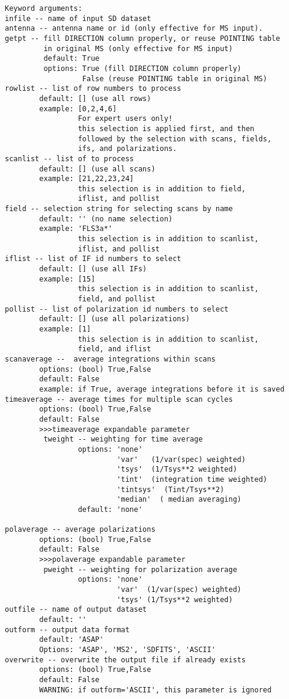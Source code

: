 \begin{verbatim}
Keyword arguments:
infile -- name of input SD dataset
antenna -- antenna name or id (only effective for MS input). 
getpt -- fill DIRECTION column properly, or reuse POINTING table 
         in original MS (only effective for MS input)
         default: True
         options: True (fill DIRECTION column properly)
                  False (reuse POINTING table in original MS)
rowlist -- list of row numbers to process
        default: [] (use all rows)
        example: [0,2,4,6]
                 For expert users only!
                 this selection is applied first, and then 
                 followed by the selection with scans, fields, 
                 ifs, and polarizations. 
scanlist -- list of to process
        default: [] (use all scans)
        example: [21,22,23,24]
                 this selection is in addition to field,
                 iflist, and pollist
field -- selection string for selecting scans by name
        default: '' (no name selection)
        example: 'FLS3a*'
                 this selection is in addition to scanlist,
                 iflist, and pollist
iflist -- list of IF id numbers to select
        default: [] (use all IFs)
        example: [15]
                 this selection is in addition to scanlist,
                 field, and pollist
pollist -- list of polarization id numbers to select
        default: [] (use all polarizations)
        example: [1]
                 this selection is in addition to scanlist,
                 field, and iflist
scanaverage --  average integrations within scans
        options: (bool) True,False
        default: False
        example: if True, average integrations before it is saved
timeaverage -- average times for multiple scan cycles
        options: (bool) True,False
        default: False
        >>>timeaverage expandable parameter
         tweight -- weighting for time average
                 options: 'none'
                          'var'   (1/var(spec) weighted)
                          'tsys'  (1/Tsys**2 weighted)
                          'tint'  (integration time weighted)
                          'tintsys'  (Tint/Tsys**2)
                          'median'  ( median averaging)
                 default: 'none'

polaverage -- average polarizations
        options: (bool) True,False
        default: False
        >>>polaverage expandable parameter
         pweight -- weighting for polarization average
                 options: 'none'
                          'var'  (1/var(spec) weighted)
                          'tsys' (1/Tsys**2 weighted)
outfile -- name of output dataset
        default: '' 
outform -- output data format
        default: 'ASAP'
        Options: 'ASAP', 'MS2', 'SDFITS', 'ASCII'
overwrite -- overwrite the output file if already exists
        options: (bool) True,False
        default: False
        WARNING: if outform='ASCII', this parameter is ignored
\end{verbatim}

